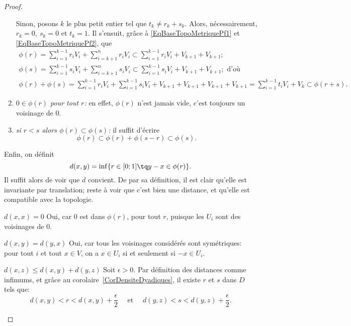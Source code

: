 \begin{proof}
\begin{enumerate}
    Sinon, posons \(k \) le plus petit entier tel que \( t_k \neq r_k + s_k\). Alors, nécessairement, \( r_k = 0,\ s_k = 0\) et \( t_k = 1\). Il s'ensuit, grâce à \eqref{EqBaseTopoMetriquePf1} et \eqref{EqBaseTopoMetriquePf2}, que
    \begin{gather}
      \phi(r) = \sum_{i=1}^{k-1} r_i V_i + \sum_{i=k+1}^n r_i V_i \subset \sum_{i=1}^{k-1} r_i V_i + V_{k+1}+ V_{k+1};\\
      \phi(s) = \sum_{i=1}^{k-1} s_i V_i + \sum_{i=k+1}^n s_i V_i \subset \sum_{i=1}^{k-1} s_i V_i + V_{k+1}+ V_{k+1};\text{ d'où}\\
      \phi(r)+\phi(s) = \sum_{i=1}^{k-1} r_i V_i + \sum_{i=1}^{k-1} s_i V_i + V_{k+1}+ V_{k+1} + V_{k+1}+ V_{k+1} = \sum_{i=1}^{k-1} t_i V_i + V_k \subset \phi(r+s).
    \end{gather}
  \item \emph{\(0  \in \phi(r)\) pour tout \(r\):} en effet, \(\phi(r)\) n'est jamais vide, c'est toujours un voisinage de \(0\).
  \item \label{PhiEstTotalementOrdonne} \emph{si \(r < s \) alors \( \phi(r) \subset \phi(s) \):} il suffit d'écrire
    \begin{equation}
      \phi(r) \subset \phi(r) + \phi(s-r) \subset \phi(s).
    \end{equation}
\end{enumerate}
Enfin, on définit
\begin{equation}\label{EqDefDistanceCompatible}
d(x,y) = \inf\{r \in \mathopen[0;1\mathclose] \tq y - x \in \phi(r)\}.
\end{equation}
Il suffit alors de voir que \(d\) convient. De par sa définition, il est clair qu'elle est invariante par translation; reste à voir que c'est bien une distance, et qu'elle est compatible avec la topologie.
\begin{subproof}
\item [$d(x,x) = 0$] Oui, car \(0\) est dans \(\phi(r)\), pour tout \(r \), puisque les \( U_i \) sont des voisinages de \(0\).
\item[$d(x,y) = d(y,x)$] Oui, car tous les voisinages considérés sont symétriques: pour tout \(i\) et tout \(x \in V\), on a \(x \in U_i\) si et seulement si  \(-x \in U_i\).
\item[$d(x,z) \leq d(x,y) + d(y,z)$] Soit \(\epsilon > 0 \). Par définition des distances comme infimums, et grâce au corolaire~\ref{CorDensiteDyadiques}, il existe \(r\) et \(s\) dans \( D \) tels que:
  \begin{equation}
    d(x,y) < r < d(x,y) + \frac \epsilon 2 \quad\text{ et }\quad d(y,z) < s < d(y,z) + \frac \epsilon 2 .

\end{equation}
\end{subproof}
\end{proof}
